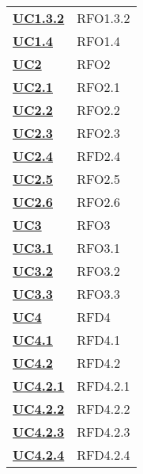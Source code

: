 \begin{longtable}[H]{| >{\centering\bfseries}p{8cm} | >{\centering\arraybackslash}p{8cm} |}
    \hyperref[par:uc1.3.2]{UC1.3.2} & RFO1.3.2 \\

    \hyperref[ssub:uc1.4]{UC1.4} & RFO1.4 \\



    \hyperref[sub:uc2]{UC2} &  RFO2\\

    \hyperref[ssub:uc2.1]{UC2.1} & RFO2.1 \\

    \hyperref[ssub:uc2.2]{UC2.2} & RFO2.2 \\

    \hyperref[ssub:uc2.3]{UC2.3} & RFO2.3 \\

    \hyperref[ssub:uc2.4]{UC2.4} & RFD2.4 \\

    \hyperref[ssub:uc2.5]{UC2.5} & RFO2.5 \\

    \hyperref[ssub:UC2.6]{UC2.6} & RFO2.6 \\



    \hyperref[sub:uc3]{UC3} & RFO3 \\

    \hyperref[ssub:uc3.1]{UC3.1} & RFO3.1 \\

    \hyperref[ssub:uc3.2]{UC3.2} & RFO3.2 \\

    \hyperref[ssub:uc3.3]{UC3.3} & RFO3.3 \\




    \hyperref[sub:uc4]{UC4} & RFD4 \\

    \hyperref[ssub:uc4.1]{UC4.1} & RFD4.1 \\

    \hyperref[ssub:uc4.2]{UC4.2} & RFD4.2 \\

    \hyperref[par:uc4.2.1]{UC4.2.1} & RFD4.2.1 \\

    \hyperref[par:uc4.2.2]{UC4.2.2} & RFD4.2.2 \\

    \hyperref[par:uc4.2.3]{UC4.2.3}  & RFD4.2.3 \\

    \hyperref[par:uc4.2.4]{UC4.2.4} & RFD4.2.4 \\


\end{longtable}
